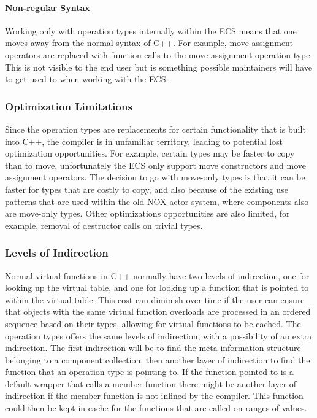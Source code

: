\paragraph{Non-regular Syntax}
Working only with operation types internally within the ECS means that one moves away from the normal syntax of C++.
For example, move assignment operators are replaced with function calls to the move assignment operation type.
This is not visible to the end user but is something possible maintainers will have to get used to when working with the ECS.

\subsubsection{Optimization Limitations}
Since the operation types are replacements for certain functionality that is built into C++, the compiler is in
unfamiliar territory, leading to potential lost optimization opportunities.
For example, certain types may be faster to copy than to move, unfortunately the ECS only support move constructors and move assignment operators.
The decision to go with move-only types is that it can be faster for types that are costly to copy, and also because of the existing use patterns that are used within the old NOX actor system, where components also are move-only types.
Other optimizations opportunities are also limited, for example, removal of destructor calls on trivial types.

\subsubsection{Levels of Indirection}
Normal virtual functions in C++ normally have two levels of indirection, one for looking up the virtual table, and one for looking up a function that is pointed to within the virtual table.
This cost can diminish over time if the user can ensure that objects with the same virtual function overloads are processed in an ordered sequence based on their types, allowing for virtual functions to be cached.
The operation types offers the same levels of indirection, with a possibility of an extra indirection.
The first indirection will be to find the meta information structure belonging to a component collection, then another layer of indirection to find the function that an operation type is pointing to.
If the function pointed to is a default wrapper that calls a member function there might be another layer of indirection if the member function is not inlined by the compiler.
This function could then be kept in cache for the functions that are called on ranges of values.
